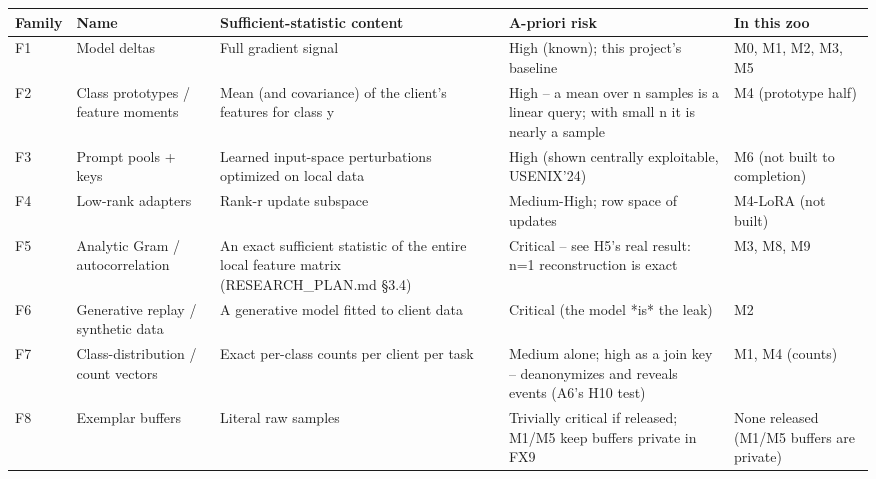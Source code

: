 \begin{tabular}{llp{3.5cm}p{3cm}l}
\toprule
Family & Name & Sufficient-statistic content & A-priori risk & In this zoo \\
\midrule
F1 & Model deltas & Full gradient signal & High (known); this project's baseline & M0, M1, M2, M3, M5 \\
F2 & Class prototypes / feature moments & Mean (and covariance) of the client's features for class y & High -- a mean over n samples is a linear query; with small n it is nearly a sample & M4 (prototype half) \\
F3 & Prompt pools + keys & Learned input-space perturbations optimized on local data & High (shown centrally exploitable, USENIX'24) & M6 (not built to completion) \\
F4 & Low-rank adapters & Rank-r update subspace & Medium-High; row space of updates & M4-LoRA (not built) \\
F5 & Analytic Gram / autocorrelation & An exact sufficient statistic of the entire local feature matrix (RESEARCH\_PLAN.md §3.4) & Critical -- see H5's real result: n=1 reconstruction is exact & M3, M8, M9 \\
F6 & Generative replay / synthetic data & A generative model fitted to client data & Critical (the model *is* the leak) & M2 \\
F7 & Class-distribution / count vectors & Exact per-class counts per client per task & Medium alone; high as a join key -- deanonymizes and reveals events (A6's H10 test) & M1, M4 (counts) \\
F8 & Exemplar buffers & Literal raw samples & Trivially critical if released; M1/M5 keep buffers private in FX9 & None released (M1/M5 buffers are private) \\
\bottomrule
\end{tabular}
